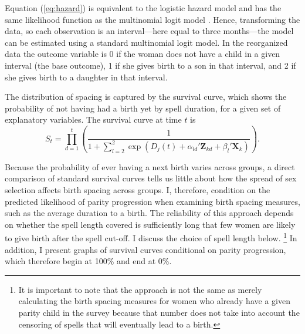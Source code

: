 \documentclass[12pt,letterpaper]{article}
\begin{document}
Equation (\ref{eq:hazard}) is equivalent to the logistic hazard model and has the same 
likelihood function as the multinomial logit model \citep{allison82,jenkins95}.
Hence, transforming the data, so each observation is an interval---here equal
to three months---the model can be estimated using a standard multinomial logit model.
%
In the reorganized data the outcome variable is 0 if the woman does not have a child in a 
given interval (the base outcome), 1 if she gives birth to a son in that interval, and 2 
if she gives birth to a daughter in that interval.

The distribution of spacing is captured by the survival curve, which shows the probability 
of not having had a birth yet by spell duration, for a given set of explanatory variables.
The survival curve at time $t$ is 
\begin{equation}
\label{eq:survival}
S_{t} 
= 
\prod_{d=1}^t
\left(
\frac{ 1 }
{1 + \sum_{l=2}^2 \exp(D_j(t) + \alpha_{ld}'\mathbf{Z}_{kd} + \beta_l'\mathbf{X}_{k})}
\right).
\end{equation}

Because the probability of ever having a next birth varies across groups, a direct 
comparison of standard survival curves tells us little about how the spread of sex 
selection affects birth spacing across groups.
I, therefore, condition on the predicted likelihood of parity progression when examining 
birth spacing measures, such as the average duration to a birth.
The reliability of this approach depends on whether the spell length covered is 
sufficiently long that few women are likely to give birth after the spell cut-off.
I discuss the choice of spell length below.%
\footnote{
It is important to note that the approach is not the same as merely calculating 
the birth spacing measures for women who already have a given 
parity child in the survey because that number does not take into account
the censoring of spells that will eventually lead to a birth.
}
In addition, I present graphs of survival curves conditional on parity progression,
which therefore begin at 100\% and end at 0\%.
\end{document}
